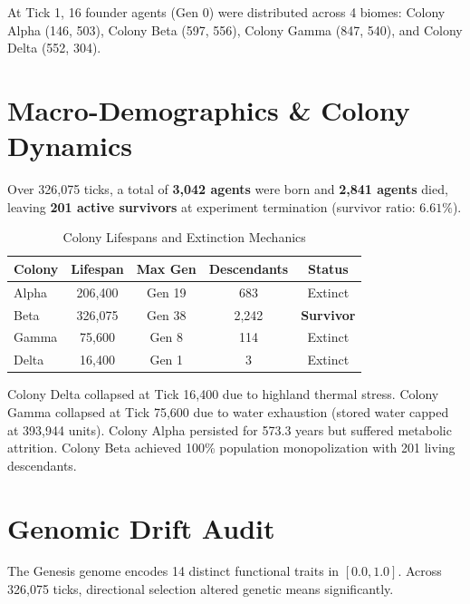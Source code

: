 \documentclass[11pt,a4paper,twocolumn]{article}
\begin{document}
At Tick 1, 16 founder agents (Gen 0) were distributed across 4 biomes: Colony Alpha (146, 503), Colony Beta (597, 556), Colony Gamma (847, 540), and Colony Delta (552, 304).

\section{Macro-Demographics \& Colony Dynamics}
Over 326,075 ticks, a total of \textbf{3,042 agents} were born and \textbf{2,841 agents} died, leaving \textbf{201 active survivors} at experiment termination (survivor ratio: $6.61\%$).

\begin{table}[h]
\centering
\small
\caption{Colony Lifespans and Extinction Mechanics}
\begin{tabular}{lcccc}
\toprule
\textbf{Colony} & \textbf{Lifespan} & \textbf{Max Gen} & \textbf{Descendants} & \textbf{Status} \\
\midrule
Alpha & 206,400 & Gen 19 & 683 & Extinct \\
Beta & 326,075 & Gen 38 & 2,242 & \textbf{Survivor} \\
Gamma & 75,600 & Gen 8 & 114 & Extinct \\
Delta & 16,400 & Gen 1 & 3 & Extinct \\
\bottomrule
\end{tabular}
\end{table}

Colony Delta collapsed at Tick 16,400 due to highland thermal stress. Colony Gamma collapsed at Tick 75,600 due to water exhaustion (stored water capped at 393,944 units). Colony Alpha persisted for 573.3 years but suffered metabolic attrition. Colony Beta achieved 100\% population monopolization with 201 living descendants.

\section{Genomic Drift Audit}
The Genesis genome encodes 14 distinct functional traits in $[0.0, 1.0]$. Across 326,075 ticks, directional selection altered genetic means significantly.
\end{document}
